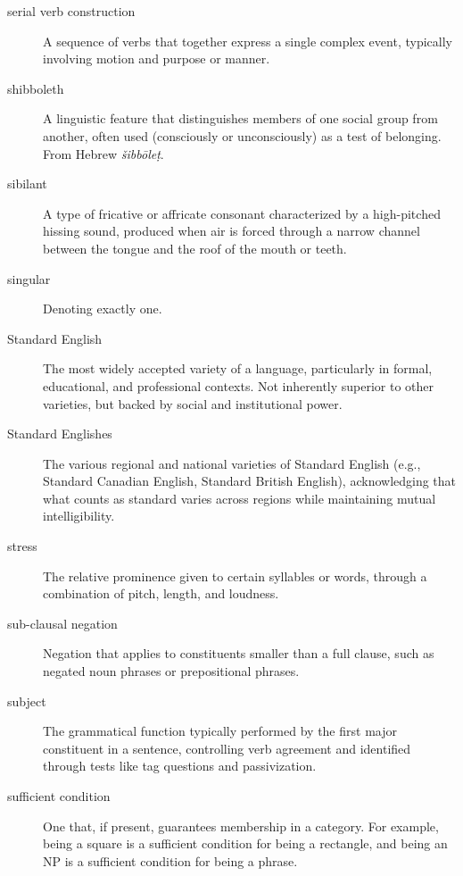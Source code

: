 \begin{description}
\item[serial verb construction] A sequence of verbs that together express a single complex event, typically involving motion and purpose or manner.

\item[shibboleth] A linguistic feature that distinguishes members of one social group from another, often used (consciously or unconsciously) as a test of belonging. From Hebrew \textit{\v{s}ibb\=ole\d{t}}.

\item[sibilant] A type of fricative or affricate consonant characterized by a high-pitched hissing sound, produced when air is forced through a narrow channel between the tongue and the roof of the mouth or teeth.

\item[singular] Denoting exactly one.

\item[Standard English] The most widely accepted variety of a language, particularly in formal, educational, and professional contexts. Not inherently superior to other varieties, but backed by social and institutional power.

\item[Standard Englishes] The various regional and national varieties of Standard English (e.g., Standard Canadian English, Standard British English), acknowledging that what counts as standard varies across regions while maintaining mutual intelligibility.

\item[stress] The relative prominence given to certain syllables or words, through a combination of pitch, length, and loudness.

\item[sub-clausal negation] Negation that applies to constituents smaller than a full clause, such as negated noun phrases or prepositional phrases.

\item[subject] The grammatical function typically performed by the first major constituent in a sentence, controlling verb agreement and identified through tests like tag questions and passivization.

\item[sufficient condition] One that, if present, guarantees membership in a category. For example, being a square is a sufficient condition for being a rectangle, and being an NP is a sufficient condition for being a phrase.


\end{description}
